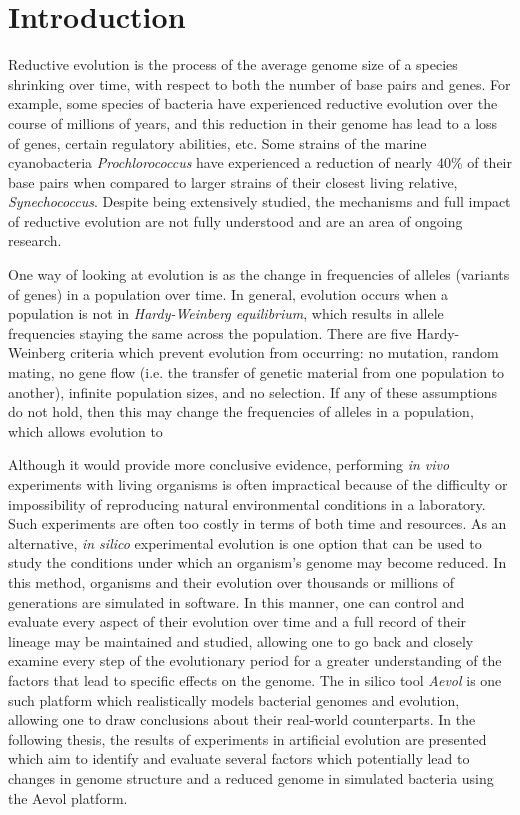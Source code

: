 \chapter{Introduction}\label{ch:intro}
Reductive evolution is the process of the average genome size of a species shrinking over time, with respect to both the number of base pairs and genes. For example, some species of bacteria have experienced reductive evolution over the course of millions of years, and this reduction in their genome has lead to a loss of genes, certain regulatory abilities, etc. Some strains of the marine cyanobacteria \textit{Prochlorococcus} have experienced a reduction of nearly 40\% of their base pairs when compared to larger strains of their closest living relative, \textit{Synechococcus}\cite{sun_zhiyi_blanchard}. Despite being extensively studied, the mechanisms and full impact of reductive evolution are not fully understood and are an area of ongoing research. 

One way of looking at evolution is as the change in frequencies of alleles (variants of genes) in a population over time. In general, evolution occurs when a population is not in \textit{Hardy-Weinberg equilibrium}, which results in allele frequencies staying the same across the population. There are five Hardy-Weinberg criteria which prevent evolution from occurring: no mutation, random mating, no gene flow (i.e. the transfer of genetic material from one population to another), infinite population sizes, and no selection\cite{cutter2019primer}. If any of these assumptions do not hold, then this may change the frequencies of alleles in a population, which allows evolution to %

Although it would provide more conclusive evidence, performing \textit{in vivo} experiments with living organisms is often impractical because of the difficulty or impossibility of reproducing natural environmental conditions in a laboratory. Such experiments are often too costly in terms of both time and resources. As an alternative, \textit{in silico} experimental evolution is one option that can be used to study the conditions under which an organism's genome may become reduced. In this method, organisms and their evolution over thousands or millions of generations are simulated in software. In this manner, one can control and evaluate every aspect of their evolution over time and a full record of their lineage may be maintained and studied, allowing one to go back and closely examine every step of the evolutionary period for a greater understanding of the factors that lead to specific effects on the genome. The in silico tool \textit{Aevol} is one such platform which realistically models bacterial genomes and evolution, allowing one to draw conclusions about their real-world counterparts. In the following thesis, the results of experiments in artificial evolution are presented which aim to identify and evaluate several factors which potentially lead to changes in genome structure and a reduced genome in simulated bacteria using the Aevol platform. 

